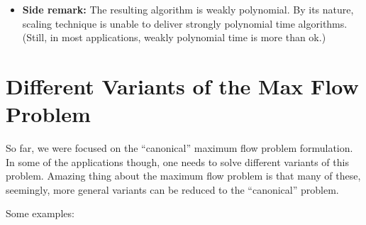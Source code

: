 \documentclass{article}
\begin{document}
\begin{itemize}
\item \textbf{Side remark:} The resulting algorithm is weakly polynomial. By its nature, scaling technique is unable to deliver strongly polynomial time algorithms. (Still, in most applications, weakly polynomial time is more than ok.)
\end{itemize}


\iffalse
\section{Different Variants of the Max Flow Problem}

So far, we were focused on the ``canonical'' maximum flow problem formulation. In some of the applications though, one needs to solve different variants of this problem. Amazing thing about the maximum flow problem is that many of these, seemingly, more general variants can be reduced to the ``canonical'' problem. 

Some examples:
\end{document}
